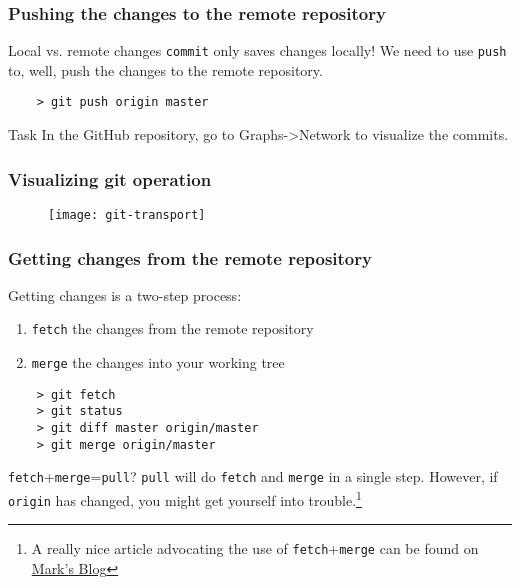 \begin{frame}[fragile]
	\frametitle{Pushing the changes to the remote repository}
	
	\begin{block}{Local vs. remote changes}
	\texttt{commit} only saves changes \alert{locally}! We need to use \texttt{push} to, well, push the changes to the remote repository. 
	\end{block}
	
	\begin{verbatim}
	> git push origin master
	\end{verbatim}
	
	\begin{block}{Task}
	In the GitHub repository, go to Graphs->Network to visualize the commits.
	\end{block}
\end{frame}


\begin{frame}[fragile]
	\frametitle{Visualizing git operation}
	
	\begin{figure}
		\texttt{[image: git-transport]}
	\end{figure}
\end{frame}



\begin{frame}[fragile]
	\frametitle{Getting changes from the remote repository}
	
	Getting changes is a two-step process:
	\begin{enumerate}
		\item \texttt{fetch} the changes from the remote repository
		\item \texttt{merge} the changes into your working tree
	\end{enumerate}
	
	\begin{verbatim}
	> git fetch
	> git status
	> git diff master origin/master
	> git merge origin/master
	\end{verbatim}
	
	\begin{block}{\texttt{fetch}+\texttt{merge}=\texttt{pull}?}
	\texttt{pull} will do \texttt{fetch} and \texttt{merge} in a single step. However, if \texttt{origin} has changed, you might get yourself into trouble.\footnote{A really nice article advocating the use of \texttt{fetch}+\texttt{merge} can be found on \href{http://longair.net/blog/2009/04/16/git-fetch-and-merge/}{Mark's Blog}} 
	\end{block}
\end{frame}

